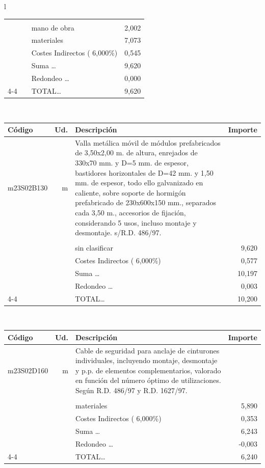 \documentclass{book}%
\begin{document}
\begin{longtable}{l}
\begin{tabular}{l r p{60mm} r}
&&&\\%
&&mano de obra&     2,002\\%
&&materiales&     7,073\\%
&&Costes Indirectos (     6,000\%)&     0,545\\%
&&Suma \ldots&     9,620\\%
&&Redondeo \ldots&     0,000\\%
\cline{4-4}%
&&TOTAL\ldots&     9,620\\%
\end{tabular}\\%
\begin{tabular}{l r p{60mm} r}%
Código&Ud.&Descripción&Importe\\%
\hline%
m23S02B130&m&Valla metálica móvil de módulos prefabricados de 3,50x2,00 m. de altura, enrejados de 330x70 mm. y D=5 mm. de espesor, bastidores horizontales de D=42 mm. y 1,50 mm. de espesor, todo ello galvanizado en caliente, sobre soporte de hormigón prefabricado de 230x600x150 mm., separados cada 3,50 m., accesorios de fijación, considerando 5 usos, incluso montaje y desmontaje. s/R.D. 486/97.&\\%
&&&\\%
&&sin clasificar&     9,620\\%
&&Costes Indirectos (     6,000\%)&     0,577\\%
&&Suma \ldots&    10,197\\%
&&Redondeo \ldots&     0,003\\%
\cline{4-4}%
&&TOTAL\ldots&    10,200\\%
\end{tabular}\\%
\begin{tabular}{l r p{60mm} r}%
Código&Ud.&Descripción&Importe\\%
\hline%
m23S02D160&m&Cable de seguridad para anclaje de cinturones individuales, incluyendo montaje, desmontaje y p.p. de elementos complementarios, valorado en función del número óptimo de utilizaciones. Según R.D. 486/97 y R.D. 1627/97.&\\%
&&&\\%
&&materiales&     5,890\\%
&&Costes Indirectos (     6,000\%)&     0,353\\%
&&Suma \ldots&     6,243\\%
&&Redondeo \ldots&    {-}0,003\\%
\cline{4-4}%
&&TOTAL\ldots&     6,240\\%
\end{tabular}\\%

\end{longtable}
\end{document}
